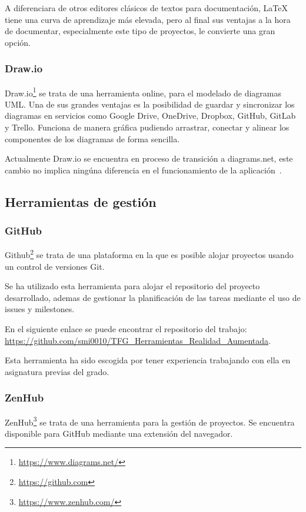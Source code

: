 A diferenciara de otros editores clásicos de textos para documentación, \LaTeX{} tiene una curva de aprendizaje más elevada, pero al final sus ventajas a la hora de documentar, especialmente este tipo de proyectos, le convierte una gran opción.


\subsubsection{Draw.io}
Draw.io\footnote{\url{https://www.diagrams.net/}} se trata de una herramienta online, para el modelado de diagramas UML. Una de sus grandes ventajas es la posibilidad de guardar y sincronizar los diagramas en servicios como Google Drive, OneDrive, Dropbox, GitHub, GitLab y Trello. Funciona de manera gráfica pudiendo arrastrar, conectar y alinear los componentes de los diagramas de forma sencilla.

Actualmente Draw.io se encuentra en proceso de transición a diagrams.net, este cambio no implica ningúna diferencia en el funcionamiento de la aplicación~\cite{diagramsNet}.



\subsection{Herramientas de gestión}

\subsubsection{GitHub}\label{github}
Github\footnote{\url{https://github.com}} se trata de una plataforma en la que es posible alojar proyectos usando un control de versiones Git.

Se ha utilizado esta herramienta para alojar el repositorio del proyecto desarrollado, ademas de gestionar la planificación de las tareas mediante el uso de issues y milestones.

En el siguiente enlace se puede encontrar el repositorio del trabajo: \url{https://github.com/smi0010/TFG_Herramientas_Realidad_Aumentada}.

Esta herramienta ha sido escogida por tener experiencia trabajando con ella en asignatura previas del grado.

\subsubsection{ZenHub}\label{ZenHub}
ZenHub\footnote{\url{https://www.zenhub.com/}} se trata de una herramienta para la gestión de proyectos. Se encuentra disponible para GitHub mediante una extensión del navegador.

